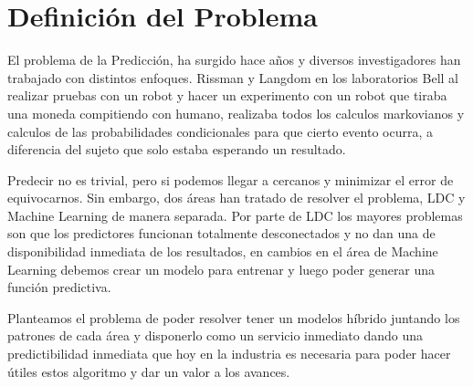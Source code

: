 

\section{Definición del Problema}


El problema de la Predicción, ha surgido hace años y diversos investigadores han trabajado con distintos enfoques. Rissman y Langdom en los laboratorios Bell al realizar pruebas con un robot y hacer un experimento con un robot que tiraba una moneda compitiendo con humano, realizaba todos los calculos markovianos y calculos de las probabilidades condicionales para que cierto evento ocurra, a diferencia del sujeto que solo estaba esperando un resultado.

Predecir no es trivial, pero si podemos llegar a cercanos y minimizar el error de equivocarnos. Sin embargo, dos áreas han tratado de resolver el problema, LDC y Machine Learning de manera separada. Por parte de LDC los mayores problemas son que los predictores funcionan totalmente desconectados y no dan una de disponibilidad inmediata de los resultados, en cambios en el área de Machine Learning debemos crear un modelo para entrenar y luego poder generar una función predictiva.

Planteamos el problema de poder resolver tener un modelos híbrido juntando los patrones de cada área y disponerlo como un servicio inmediato dando una predictibilidad inmediata que hoy en la industria es necesaria para poder hacer útiles estos algoritmo y dar un valor a los avances.

 